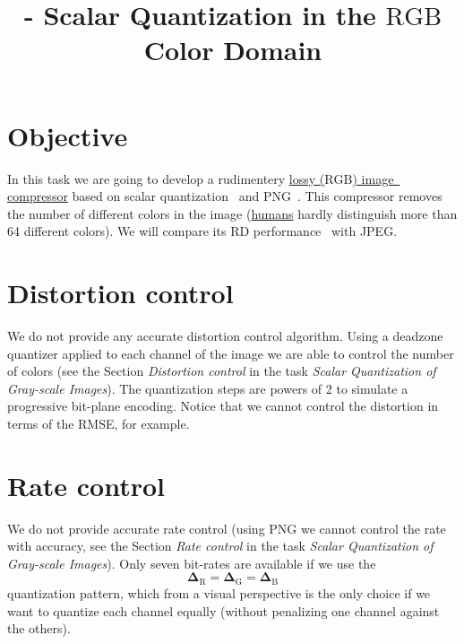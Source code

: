 

\title{\SM{} - Scalar Quantization in the $\text{RGB}$ Color Domain}

\maketitle
\tableofcontents

\section{Objective}
In this task we are going to develop a rudimentery
\href{https://en.wikipedia.org/wiki/Lossy_compression}{lossy
  ($\text{RGB}$) image~\cite{vruiz__image_IO} compressor} based on
scalar quantization~\cite{vruiz__scalar_quantization} and
PNG~\cite{vruiz__PNG}. This compressor removes the number of different
colors in the image
(\href{https://en.wikipedia.org/wiki/Visual_system}{humans} hardly
distinguish more than 64 different colors). We will compare its
RD performance~\cite{vruiz__information_theory} with JPEG.

\section{Distortion control}
We do not provide any accurate distortion control algorithm. Using a
deadzone quantizer applied to each channel of the image we are able to
control the number of colors (see the Section \emph{Distortion
control} in the task \emph{Scalar Quantization of Gray-scale
Images}). The quantization steps are powers of $2$ to simulate a
progressive bit-plane encoding.  Notice that we cannot control the
distortion in terms of the RMSE, for example.

\section{Rate control}
We do not provide accurate rate control (using PNG we cannot control
the rate with accuracy, see the Section \emph{Rate control} in the
task \emph{Scalar Quantization of Gray-scale Images}). Only seven
bit-rates are available if we use the
\begin{equation}
  \mathbf{\Delta}_{\text{R}} = \mathbf{\Delta}_{\text{G}} = \mathbf{\Delta}_{\text{B}}
  \label{eq:simple_Q}
\end{equation}
quantization pattern, which from a visual perspective is the only choice if we want to quantize each channel equally (without penalizing one channel against the others).


